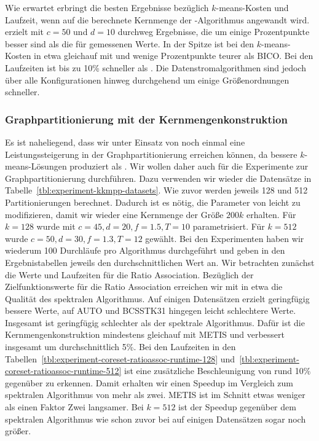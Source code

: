 Wie erwartet erbringt \KCsTwo{} die besten Ergebnisse bezüglich $k$-means-Kosten und Laufzeit, wenn auf die berechnete Kernmenge
der \kmpp-Algorithmus angewandt wird. \KCsTwo{} erzielt mit $c=50$ und $d=10$ durchweg Ergebnisse, die um einige Prozentpunkte
besser sind als die für \kmpp{} gemessenen Werte. In der Spitze ist \KCsTwo{} bei den $k$-means-Kosten in etwa gleichauf mit
\Skmpp{} und wenige Prozentpunkte teurer als BICO. Bei den Laufzeiten ist \KCsTwo{} bis zu 10\% schneller als \kmpp{}. Die
Datenstromalgorithmen sind jedoch über alle Konfigurationen hinweg durchgehend um einige Größenordnungen schneller.

\subsubsection{Graphpartitionierung mit der Kernmengenkonstruktion}
Es ist naheliegend, dass wir unter Einsatz von \KCsTwo{} noch einmal eine Leistungssteigerung in der Graphpartitionierung
erreichen können, da \KCsTwo{} bessere $k$-means-Lösungen produziert als \kmpp.
Wir wollen daher auch für \KCsTwo{} die Experimente zur Graphpartitionierung durchführen. Dazu verwenden wir wieder
die Datensätze in Tabelle~\ref{tbl:experiment-kkmpp-datasets}. Wie zuvor werden jeweils 128 und 512 Partitionierungen berechnet.
Dadurch ist es nötig, die Parameter von \KCsTwo{} leicht zu modifizieren, damit wir wieder eine Kernmenge der Größe
$200k$ erhalten. Für $k = 128$ wurde \KCsTwo{} mit $c = 45, d = 20, f = 1.5, T = 10$ parametrisiert. Für $k = 512$ wurde
$c = 50, d = 30, f = 1.3, T = 12$ gewählt. Bei den Experimenten haben wir wiederum 100 Durchläufe pro Algorithmus durchgeführt
und geben in den Ergebnistabellen jeweils den durchschnittlichen Wert an.
Wir betrachten zunächst die Werte und Laufzeiten für die Ratio Association.
\absatz
Bezüglich der Zielfunktionswerte für die Ratio Association erreichen wir mit \KCsTwo{} in etwa die Qualität des spektralen
Algorithmus. Auf einigen Datensätzen erzielt \KCsTwo{} geringfügig bessere Werte, auf AUTO und BCSSTK31 hingegen leicht schlechtere
Werte. Insgesamt ist \KCsTwo{} geringfügig schlechter als der spektrale Algorithmus. Dafür ist die Kernmengenkonstruktion
mindestens gleichauf mit METIS und verbessert \kkmpp{} insgesamt um durchschnittlich 5\%. Bei den Laufzeiten in
den Tabellen~\ref{tbl:experiment-coreset-ratioassoc-runtime-128} und~\ref{tbl:experiment-coreset-ratioassoc-runtime-512}
ist eine zusätzliche Beschleunigung von rund 10\% gegenüber \kkmpp{} zu erkennen. Damit erhalten wir einen Speedup im Vergleich
zum spektralen Algorithmus von mehr als zwei. METIS ist im Schnitt etwas weniger als einen Faktor Zwei langsamer.
Bei $k = 512$ ist der Speedup gegenüber dem spektralen Algorithmus wie schon zuvor bei \kkmpp{} auf einigen Datensätzen sogar
noch größer.

